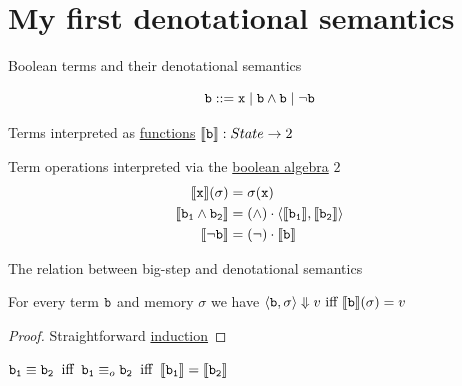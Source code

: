 \documentclass{beamer}
\begin{document}
\section{My first denotational semantics}

\begin{frame}{Boolean terms and their denotational semantics}

        \begin{block}{\vspace*{-3.5ex}}
        \[
                \mathtt{b} ::= \mathtt{x} \mid \mathtt{b} \wedge \mathtt{b} \mid \neg \mathtt{b}
        \]
        \end{block} 

        Terms interpreted as \alert{\underline{functions}}
        $\llbracket \mathtt{b} \rrbracket : State \to 2$

        Term operations interpreted via the \alert{\underline{boolean algebra}} $2$
        \bigskip
        \begin{align*}
                \llbracket \mathtt{x} \rrbracket(\sigma) & = \sigma (\mathtt{x}) \\
                \llbracket \mathtt{b_1} \wedge \mathtt{b_2} \rrbracket & 
                = (\wedge) \cdot \langle \llbracket \mathtt{b_1} \rrbracket, \llbracket \mathtt{b_2} \rrbracket \rangle \\
                \llbracket \neg \mathtt{b} \rrbracket & = (\neg) \cdot \llbracket \mathtt{b} \rrbracket
        \end{align*}
\end{frame}

\begin{frame}{The relation between big-step and denotational semantics}

        \begin{theorem}
                For every term $\mathtt{b}$ and memory $\sigma$ we
                have 
                $\langle \mathtt{b}, \sigma \rangle \Downarrow v \text{ iff }
                \llbracket \mathtt{b} \rrbracket(\sigma) = v$
        \end{theorem}

        \begin{proof}
                Straightforward \alert{\underline{induction}}
        \end{proof}

        \bigskip
        \bigskip
        \begin{corollary}
                $\mathtt{b_1} \equiv \mathtt{b_2} \> \text{ iff } \>
                \mathtt{b_1} \equiv_o \mathtt{b_2} \> \text{ iff } \>
                \llbracket \mathtt{b_1} \rrbracket = \llbracket \mathtt{b_2} \rrbracket$
        \end{corollary}
\end{frame}
\end{document}
